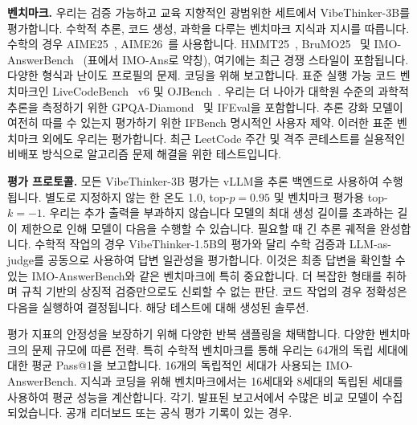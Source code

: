 \documentclass{article}
\begin{document}
\textbf{벤치마크.}
우리는 검증 가능하고 교육 지향적인 광범위한 세트에서 VibeThinker-3B를 평가합니다.
수학적 추론, 코드 생성, 과학을 다루는 벤치마크
지식과 지시를 따릅니다. 수학의 경우 AIME25~\cite{aops2025aime}, AIME26~\cite{maa2026aime}를 사용합니다.
HMMT25~\cite{hmmt2025}, BruMO25~\cite{brumo2025} 및 IMO-AnswerBench~\cite{luong2025imo}
(표에서 IMO-Ans로 약칭), 여기에는 최근 경쟁 스타일이 포함됩니다.
다양한 형식과 난이도 프로필의 문제. 코딩을 위해 보고합니다.
표준 실행 가능 코드 벤치마크인 LiveCodeBench~\cite{jain2024livecodebench} v6 및 OJBench~\cite{wang2025ojbench}. 우리는 더 나아가
대학원 수준의 과학적 추론을 측정하기 위한 GPQA-Diamond~\cite{rein2023gpqa} 및 IFEval을 포함합니다.
추론 강화 모델이 여전히 따를 수 있는지 평가하기 위한 IFBench
명시적인 사용자 제약. 이러한 표준 벤치마크 외에도 우리는 평가합니다.
최근 LeetCode 주간 및 격주 콘테스트를 실용적인 비배포 방식으로
알고리즘 문제 해결을 위한 테스트입니다.

\textbf{평가 프로토콜.}
모든 VibeThinker-3B 평가는 vLLM을 추론 백엔드로 사용하여 수행됩니다.
별도로 지정하지 않는 한 온도 1.0, top-$p=0.95$ 및
벤치마크 평가용 top-$k=-1$. 우리는 추가 출력을 부과하지 않습니다
모델의 최대 생성 길이를 초과하는 길이 제한으로 인해 모델이 다음을 수행할 수 있습니다.
필요할 때 긴 추론 궤적을 완성합니다. 수학적 작업의 경우 VibeThinker-1.5B의 평가와 달리
수학 검증과 LLM-as-judge를 공동으로 사용하여 답변 일관성을 평가합니다. 이것은
최종 답변을 확인할 수 있는 IMO-AnswerBench와 같은 벤치마크에 특히 중요합니다.
더 복잡한 형태를 취하며 규칙 기반의 상징적 검증만으로도
신뢰할 수 없는 판단. 코드 작업의 경우 정확성은 다음을 실행하여 결정됩니다.
해당 테스트에 대해 생성된 솔루션.

평가 지표의 안정성을 보장하기 위해 다양한 반복 샘플링을 채택합니다.
다양한 벤치마크의 문제 규모에 따른 전략. 특히 수학적
벤치마크를 통해 우리는 64개의 독립 세대에 대한 평균 Pass@1을 보고합니다.
16개의 독립적인 세대가 사용되는 IMO-AnswerBench. 지식과 코딩을 위해
벤치마크에서는 16세대와 8세대의 독립된 세대를 사용하여 평균 성능을 계산합니다.
각기. 발표된 보고서에서 수많은 비교 모델이 수집되었습니다.
공개 리더보드 또는 공식 평가 기록이 있는 경우.
\end{document}

